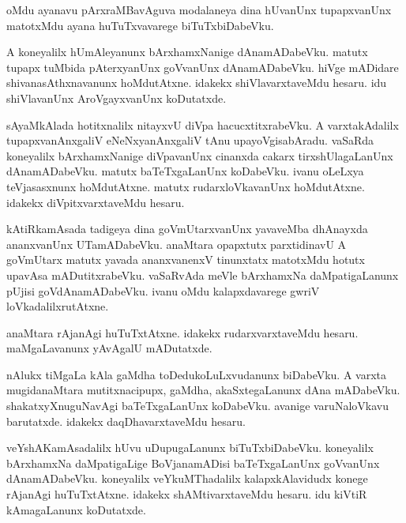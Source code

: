 \documentclass{article}
\begin{document}
\begin{mn}
oMdu  ayanavu  pArxraMBavAguva  modalaneya  dina  hUvanUnx  tupapxvanUnx  
matotxMdu  ayana  huTuTxvavarege  biTuTxbiDabeVku.
\end{mn}

\begin{mn}
A  koneyalilx  hUmAleyanunx  bArxhamxNanige  dAnamADabeVku.  matutx  tupapx  tuMbida  
pAterxyanUnx  goVvanUnx  dAnamADabeVku.  hiVge  mADidare  shivanasAthxnavanunx  
hoMdutAtxne.  idakekx  shiVlavarxtaveMdu  hesaru.  idu  shiVlavanUnx  AroVgayxvanUnx  koDutatxde.
\end{mn}

\begin{mn}
sAyaMkAlada  hotitxnalilx  nitayxvU  diVpa  hacucxtitxrabeVku.  A  varxtakAdalilx  
tupapxvanAnxgaliV  eNeNxyanAnxgaliV  tAnu  upayoVgisabAradu.  vaSaRda  koneyalilx  
bArxhamxNanige  diVpavanUnx  cinanxda  cakarx  tirxshUlagaLanUnx  dAnamADabeVku.  
matutx  baTeTxgaLanUnx  koDabeVku.  ivanu  oLeLxya  teVjasasxnunx  hoMdutAtxne.  
matutx  rudarxloVkavanUnx  hoMdutAtxne.  idakekx  diVpitxvarxtaveMdu  hesaru. 
\end{mn}

\begin{mn}
kAtiRkamAsada  tadigeya  dina  goVmUtarxvanUnx  yavaveMba  dhAnayxda  ananxvanUnx  
UTamADabeVku.  anaMtara  opapxtutx  parxtidinavU  A  goVmUtarx  matutx  yavada  
ananxvanenxV  tinunxtatx  matotxMdu  hotutx  upavAsa mADutitxrabeVku.  vaSaRvAda  
meVle  bArxhamxNa daMpatigaLanunx  pUjisi  goVdAnamADabeVku.  ivanu  oMdu  
kalapxdavarege  gwriV loVkadalilxrutAtxne.
\end{mn}

\begin{mn}
anaMtara  rAjanAgi  huTuTxtAtxne.  idakekx  rudarxvarxtaveMdu  hesaru.  maMgaLavanunx  
yAvAgalU  mADutatxde.
\end{mn}

\begin{mn}
nAlukx  tiMgaLa  kAla  gaMdha  toDedukoLuLxvudanunx  biDabeVku.  A  varxta  mugidanaMtara  
mutitxnacipupx,  gaMdha,  akaSxtegaLanunx  dAna  mADabeVku.  shakatxyXnuguNavAgi  baTeTxgaLanUnx  
koDabeVku.  avanige  varuNaloVkavu  barutatxde.  idakekx  daqDhavarxtaveMdu  hesaru.
\end{mn}

\begin{mn}
veYshAKamAsadalilx  hUvu  uDupugaLanunx  biTuTxbiDabeVku.  koneyalilx  bArxhamxNa 
daMpatigaLige  BoVjanamADisi  baTeTxgaLanUnx  goVvanUnx  dAnamADabeVku.  koneyalilx  
veYkuMThadalilx  kalapxkAlavidudx  konege  rAjanAgi  huTuTxtAtxne.  idakekx  
shAMtivarxtaveMdu  hesaru.  idu  kiVtiR  kAmagaLanunx  koDutatxde.
\end{mn}
\end{document}
